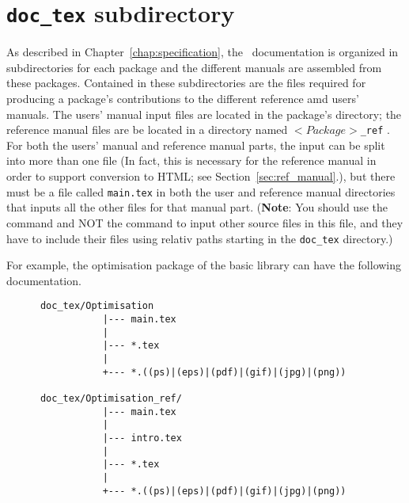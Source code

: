 
\section{{\tt doc\_tex} subdirectory}
\label{sec:doc_tex_subdirectory}

As described in Chapter~\ref{chap:specification}, the \cgal\ documentation is
organized in subdirectories for each package and the different manuals
are assembled from these packages. Contained in these
subdirectories are the files required for producing a package's contributions
to the different reference amd users' manuals. The users' manual input
files are located in the package's directory; the reference manual files are
be located in a directory named $<Package>${\tt \_ref}
.  
For both the users' manual and reference manual parts, the input can be
split into more than one file (In fact, this is necessary for the reference
manual in order to support conversion to HTML; 
see Section~\ref{sec:ref_manual}.), but there must be a file called 
{\tt main.tex} in both the user and reference manual directories that inputs 
all the other files for that manual part.
({\bf Note}: You should use the \verb|| command and NOT the 
\verb|| command to input other source files in this file, and
they have to include their files using relativ paths starting in the
\texttt{doc\_tex} directory.)  

For example, the optimisation package of 
the basic library can have the following documentation. 
\begin{verbatim}
      doc_tex/Optimisation
                 |--- main.tex
                 |
                 |--- *.tex
                 |
                 +--- *.((ps)|(eps)|(pdf)|(gif)|(jpg)|(png))

      doc_tex/Optimisation_ref/
                 |--- main.tex
                 |
                 |--- intro.tex
                 |
                 |--- *.tex
                 |
                 +--- *.((ps)|(eps)|(pdf)|(gif)|(jpg)|(png))

\end{verbatim}

